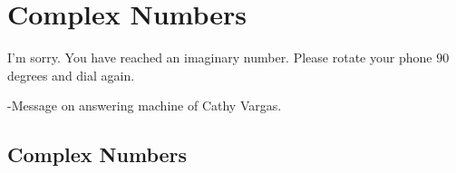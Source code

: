 
\flushbottom




\chapter{Complex Numbers}



I'm sorry.  You have reached an imaginary number.  Please rotate your phone
$90$ degrees and dial again.

\begin{flushright}
  -Message on answering machine of Cathy Vargas.
\end{flushright}








\section{Complex Numbers}







